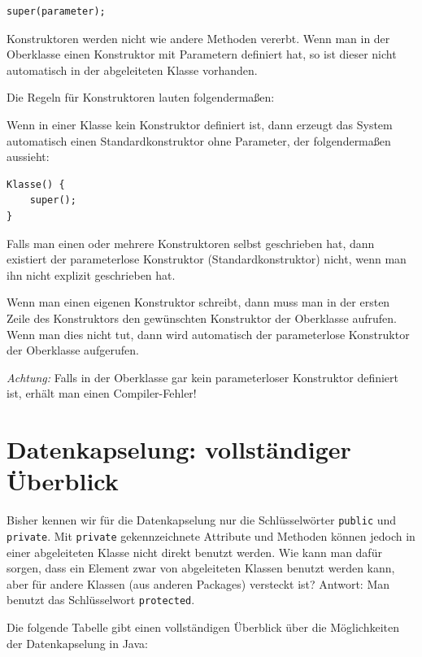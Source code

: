 \begin{lstlisting}
super(parameter);
\end{lstlisting}

Konstruktoren werden nicht wie andere Methoden vererbt. Wenn man in der
Oberklasse einen Konstruktor mit Parametern definiert hat, so ist dieser nicht
automatisch in der abgeleiteten Klasse vorhanden.

Die Regeln für Konstruktoren lauten folgendermaßen:

\begin{compactenum}[1.]
\item Wenn in einer Klasse kein Konstruktor definiert ist, dann erzeugt das
System automatisch einen Standardkonstruktor ohne Parameter, der folgendermaßen
aussieht:

\begin{lstlisting}
Klasse() {
    super();
}
\end{lstlisting}

\item Falls man einen oder mehrere Konstruktoren selbst geschrieben hat, dann
existiert der parameterlose Konstruktor (Standardkonstruktor) nicht, wenn man
ihn nicht explizit geschrieben hat.
\item Wenn man einen eigenen Konstruktor schreibt, dann muss man in der ersten
Zeile des Konstruktors den gewünschten Konstruktor der Oberklasse aufrufen.
Wenn man dies nicht tut, dann wird automatisch der parameterlose Konstruktor
der Oberklasse aufgerufen.

\emph{Achtung:} Falls in der Oberklasse gar kein parameterloser Konstruktor
definiert ist, erhält man einen Compiler-Fehler!
\end{compactenum}


\section{Datenkapselung: vollständiger Überblick}

Bisher kennen wir für die Datenkapselung nur die Schlüsselwörter \lstinline|public|
und \lstinline|private|. Mit \lstinline|private| gekennzeichnete Attribute und
Methoden können jedoch in einer abgeleiteten Klasse nicht direkt benutzt werden.
Wie kann man dafür sorgen, dass ein Element zwar von abgeleiteten Klassen
benutzt werden kann, aber für andere Klassen (aus anderen Packages) versteckt
ist? Antwort: Man benutzt das Schlüsselwort \lstinline|protected|.

Die folgende Tabelle gibt einen vollständigen Überblick über die Möglichkeiten
der Datenkapselung in Java:

